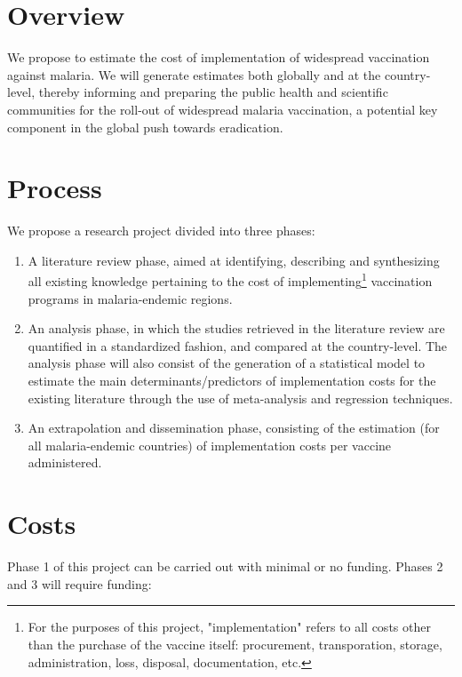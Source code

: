 \documentclass{article}
\begin{document}
\newpage

\section*{Overview}

We propose to estimate the cost of implementation of widespread vaccination against malaria. We will generate estimates both globally and at the country-level, thereby informing and preparing the public health and scientific communities for the roll-out of widespread malaria vaccination, a potential key component in the global push towards eradication.


\section*{Process}

We propose a research project divided into three phases:

\begin{enumerate}
  \setlength\itemsep{0em}
\item A literature review phase, aimed at identifying, describing and synthesizing all existing knowledge pertaining to the cost of implementing\footnote{For the purposes of this project, "implementation" refers to all costs other than the purchase of the vaccine itself: procurement, transporation, storage, administration, loss, disposal, documentation, etc.} vaccination programs in malaria-endemic regions.
\item An analysis phase, in which the studies retrieved in the literature review are quantified in a standardized fashion, and compared at the country-level. The analysis phase will also consist of the generation of a statistical model to estimate the main determinants/predictors of implementation costs for the existing literature through the use of meta-analysis and regression techniques.
\item An extrapolation and dissemination phase, consisting of the estimation (for all malaria-endemic countries) of implementation costs per vaccine administered.
\end{enumerate}

\section*{Costs}

Phase 1 of this project can be carried out with minimal or no funding. Phases 2 and 3 will require funding:
\end{document}

